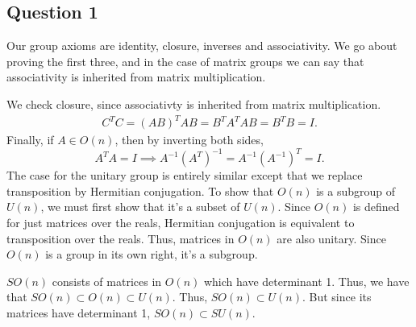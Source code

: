 \subsection{Question 1}

Our group axioms are identity, closure, inverses and associativity. 
We go about proving the first three, and in the case of matrix groups 
we can say that associativity is inherited from matrix multiplication. 


We check closure, since associativty is inherited from matrix multiplication.
\begin{align*}
C^T C = (AB)^T AB = B^T A^T A B = B^T B = I. 
\end{align*}
Finally, if $A \in O(n)$, then by inverting both sides, 
\[
A^T A = I \implies A^{-1} (A^T)^{-1} = A^{-1} (A^{-1})^T = I. 
\]
The case for the unitary group is entirely similar except that we replace transposition by Hermitian conjugation. 
To show that $O(n)$ is a subgroup of $U(n)$, we must first show that it's a subset of $U(n)$. Since $O(n)$ is defined for just matrices over the reals, Hermitian conjugation is equivalent to transposition over the reals. Thus, matrices in $O(n)$ are also unitary. Since $O(n)$ is a group in its own right, it's a subgroup. 

$SO(n)$ consists of matrices in $O(n)$ which have determinant 1. Thus, we have that $SO(n) \subset O(n) \subset U(n)$. Thus, $SO(n) \subset U(n)$. But since its matrices have determinant 1, $SO(n) \subset SU(n)$. 

